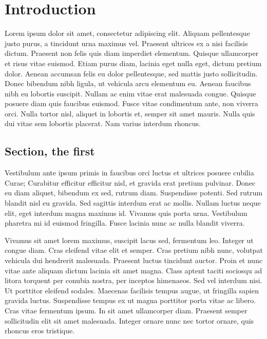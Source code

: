 %
%

\chapter{Introduction}
\label{Ch:Intro}

Lorem ipsum dolor sit amet, consectetur adipiscing elit. Aliquam pellentesque justo purus, a tincidunt urna maximus vel.
Praesent ultrices ex a nisi facilisis dictum. Praesent non felis quis diam imperdiet elementum. Quisque ullamcorper et
risus vitae euismod. Etiam purus diam, lacinia eget nulla eget, dictum pretium dolor. Aenean accumsan felis eu dolor
pellentesque, sed mattis justo sollicitudin. Donec bibendum nibh ligula, ut vehicula arcu elementum eu. Aenean faucibus
nibh eu lobortis suscipit. Nullam ac enim vitae erat malesuada congue. Quisque posuere diam quis faucibus euismod. Fusce
vitae condimentum ante, non viverra orci. Nulla tortor nisl, aliquet in lobortis et, semper sit amet mauris. Nulla quis
dui vitae sem lobortis placerat. Nam varius interdum rhoncus.

\section{Section, the first}

Vestibulum ante ipsum primis in faucibus orci luctus et ultrices posuere cubilia Curae; Curabitur efficitur efficitur
nisl, et gravida erat pretium pulvinar. Donec eu diam aliquet, bibendum ex sed, rutrum diam. Suspendisse potenti. Sed
rutrum blandit nisl eu gravida. Sed sagittis interdum erat ac mollis. Nullam luctus neque elit, eget interdum magna
maximus id. Vivamus quis porta urna. Vestibulum pharetra mi id euismod fringilla. Fusce lacinia nunc ac nulla blandit
viverra.

Vivamus sit amet lorem maximus, suscipit lacus sed, fermentum leo. Integer ut congue diam. Cras eleifend vitae elit et
semper. Cras pretium nibh nunc, volutpat vehicula dui hendrerit malesuada. Praesent luctus tincidunt auctor. Proin et
nunc vitae ante aliquam dictum lacinia sit amet magna. Class aptent taciti sociosqu ad litora torquent per conubia
nostra, per inceptos himenaeos. Sed vel interdum nisi. Ut porttitor eleifend sodales. Maecenas facilisis tempus augue,
ut fringilla sapien gravida luctus. Suspendisse tempus ex ut magna porttitor porta vitae ac libero. Cras vitae fermentum
ipsum. In sit amet ullamcorper diam. Praesent semper sollicitudin elit sit amet malesuada. Integer ornare nunc nec
tortor ornare, quis rhoncus eros tristique.

